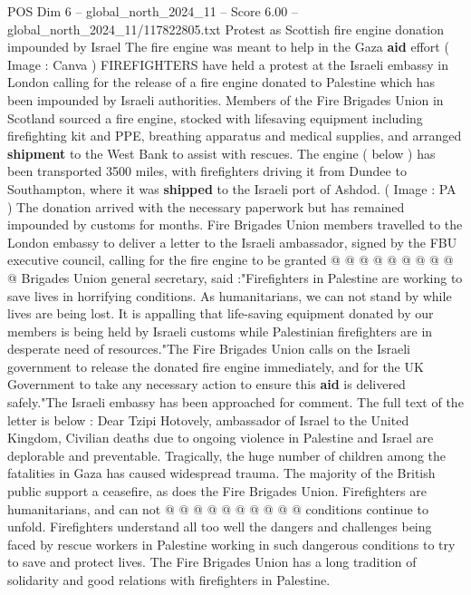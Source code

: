 \begin{textsample}{POS Dim 6 – global\_north\_2024\_11 – Score 6.00 – global\_north\_2024\_11/117822805.txt}  \label{ex:f6_pos_281}
Protest as Scottish fire engine donation impounded by Israel The fire engine was meant to help in the Gaza \textbf{aid} effort ( Image : Canva ) FIREFIGHTERS have held a protest at the Israeli embassy in London calling for the release of a fire engine donated to Palestine which has been impounded by Israeli authorities.
Members of the Fire Brigades Union in Scotland sourced a fire engine, stocked with lifesaving equipment including firefighting kit and PPE, breathing apparatus and medical supplies, and arranged \textbf{shipment} to the West Bank to assist with rescues.
The engine ( below ) has been transported 3500 miles, with firefighters driving it from Dundee to Southampton, where it was \textbf{shipped} to the Israeli port of Ashdod. ( Image : PA ) The donation arrived with the necessary paperwork but has remained impounded by customs for months.
Fire Brigades Union members travelled to the London embassy to deliver a letter to the Israeli ambassador, signed by the FBU executive council, calling for the fire engine to be granted @ @ @ @ @ @ @ @ @ @ Brigades Union general secretary, said :"Firefighters in Palestine are working to save lives in horrifying conditions.
As humanitarians, we can not stand by while lives are being lost.
It is appalling that life-saving equipment donated by our members is being held by Israeli customs while Palestinian firefighters are in desperate need of resources."The Fire Brigades Union calls on the Israeli government to release the donated fire engine immediately, and for the UK Government to take any necessary action to ensure this \textbf{aid} is delivered safely."The Israeli embassy has been approached for comment.
The full text of the letter is below : Dear Tzipi Hotovely, ambassador of Israel to the United Kingdom, Civilian deaths due to ongoing violence in Palestine and Israel are deplorable and preventable.
Tragically, the huge number of children among the fatalities in Gaza has caused widespread trauma.
The majority of the British public support a ceasefire, as does the Fire Brigades Union.
Firefighters are humanitarians, and can not @ @ @ @ @ @ @ @ @ @ conditions continue to unfold.
Firefighters understand all too well the dangers and challenges being faced by rescue workers in Palestine working in such dangerous conditions to try to save and protect lives.
The Fire Brigades Union has a long tradition of solidarity and good relations with firefighters in Palestine.

\end{textsample}
